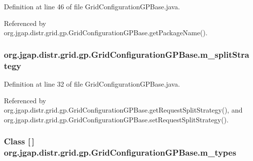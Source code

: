 Definition at line 46 of file Grid\-Configuration\-G\-P\-Base.\-java.



Referenced by org.\-jgap.\-distr.\-grid.\-gp.\-Grid\-Configuration\-G\-P\-Base.\-get\-Package\-Name().

\hypertarget{classorg_1_1jgap_1_1distr_1_1grid_1_1gp_1_1_grid_configuration_g_p_base_a2e20d662aa793c1e47a88b6007cf4646}{
\subsubsection[{m\-\_\-split\-Strategy}]{ org.\-jgap.\-distr.\-grid.\-gp.\-Grid\-Configuration\-G\-P\-Base.\-m\-\_\-split\-Strategy\hspace{0.3cm}{\ttfamily [private]}}}\label{classorg_1_1jgap_1_1distr_1_1grid_1_1gp_1_1_grid_configuration_g_p_base_a2e20d662aa793c1e47a88b6007cf4646}


Definition at line 32 of file Grid\-Configuration\-G\-P\-Base.\-java.



Referenced by org.\-jgap.\-distr.\-grid.\-gp.\-Grid\-Configuration\-G\-P\-Base.\-get\-Request\-Split\-Strategy(), and org.\-jgap.\-distr.\-grid.\-gp.\-Grid\-Configuration\-G\-P\-Base.\-set\-Request\-Split\-Strategy().

\hypertarget{classorg_1_1jgap_1_1distr_1_1grid_1_1gp_1_1_grid_configuration_g_p_base_a6d17b6ae0876a6fc28b3c5be8246b689}{
\subsubsection[{m\-\_\-types}]{\setlength{\rightskip}{0pt plus 5cm}Class \mbox{[}$\,$\mbox{]} org.\-jgap.\-distr.\-grid.\-gp.\-Grid\-Configuration\-G\-P\-Base.\-m\-\_\-types\hspace{0.3cm}{\ttfamily [private]}}}\label{classorg_1_1jgap_1_1distr_1_1grid_1_1gp_1_1_grid_configuration_g_p_base_a6d17b6ae0876a6fc28b3c5be8246b689}


